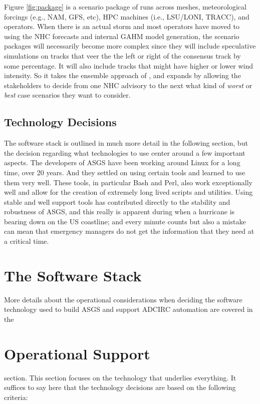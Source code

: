 \documentclass{article}
\begin{document}
Figure \ref{fig:package} is a scenario package of runs across meshes, meteorological
forcings (e.g., NAM, GFS, etc), HPC machines (i.e., LSU/LONI, TRACC), and operators.
When there is an actual storm and most operators have moved to using the NHC
forecasts and internal GAHM model generation, the scenario packages will necessarily
become more complex since they will include speculative simulations on tracks that
veer the the left or right of the consensus track by some percentage. It will
also include tracks that might have higher or lower wind intensity. So it takes
the ensemble approach of \cite{LPFS}, and expands by allowing the stakeholders to
decide from one NHC advisory to the next what kind of \textit{worst} or \textit{best}
case scenarios they want to consider.

\subsection{Technology Decisions}

The software stack is outlined in much more detail in the following section, but
the decision regarding what technologies to use center around a few important
aspects. The developers of ASGS have been working around Linux for a long time,
over 20 years. And they settled on using certain tools and learned to use them
very well. These tools, in particular Bash and Perl, also work exceptionally
well and allow for the creation of extremely long lived scripts and utilities.
Using stable and well support tools has contributed directly to the stability
and robustness of ASGS, and this really is apparent during when a hurricane is
bearing down on the US coastline; and every minute counts but also a mistake can
mean that emergency managers do not get the information that they need at a
critical time.

\section{The Software Stack}

More details about the operational considerations when deciding the software
technology used to build ASGS and support ADCIRC automation are covered in the
\section{Operational Support} section. This section focuses on the technology
that underlies everything. It suffices to say here that the technology decisions
are based on the following criteria:
\end{document}
